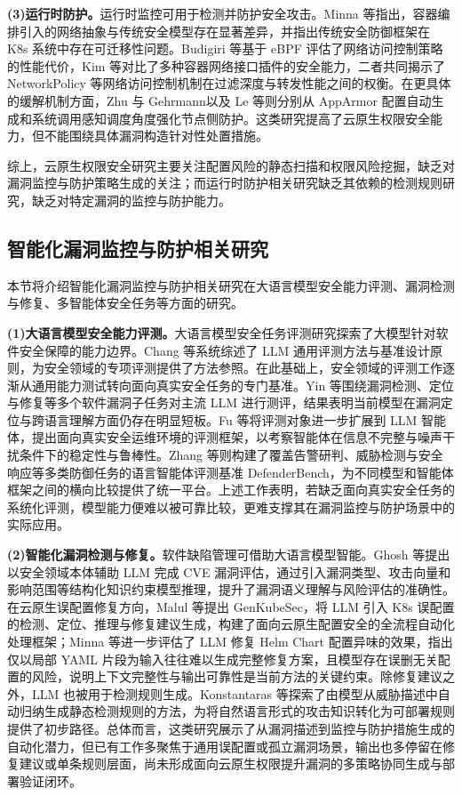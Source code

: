 \textbf{(3)运行时防护。}运行时监控可用于检测并防护安全攻击。Minna 等\cite{Minna_2021}指出，容器编排引入的网络抽象与传统安全模型存在显著差异，并指出传统安全防御框架在 K8s 系统中存在可迁移性问题。Budigiri 等\cite{Budigiri_2021}基于 eBPF 评估了网络访问控制策略的性能代价，Kim 等\cite{Kim_2025}对比了多种容器网络接口插件的安全能力，二者共同揭示了 NetworkPolicy 等网络访问控制机制在过滤深度与转发性能之间的权衡。在更具体的缓解机制方面，Zhu 与 Gehrmann\cite{Zhu_2022}以及 Le 等\cite{Le_2023}则分别从 AppArmor 配置自动生成和系统调用感知调度角度强化节点侧防护。这类研究提高了云原生权限安全能力，但不能围绕具体漏洞构造针对性处置措施。


综上，云原生权限安全研究主要关注配置风险的静态扫描和权限风险挖掘，缺乏对漏洞监控与防护策略生成的关注；而运行时防护相关研究缺乏其依赖的检测规则研究，缺乏对特定漏洞的监控与防护能力。

\subsection{智能化漏洞监控与防护相关研究}

本节将介绍智能化漏洞监控与防护相关研究在大语言模型安全能力评测、漏洞检测与修复、多智能体安全任务等方面的研究。

\textbf{(1)大语言模型安全能力评测。}大语言模型安全任务评测研究探索了大模型针对软件安全保障的能力边界。Chang 等\cite{chang2024survey}系统综述了 LLM 通用评测方法与基准设计原则，为安全领域的专项评测提供了方法参照。在此基础上，安全领域的评测工作逐渐从通用能力测试转向面向真实安全任务的专门基准。Yin 等\cite{yin2024multitask}围绕漏洞检测、定位与修复等多个软件漏洞子任务对主流 LLM 进行测评，结果表明当前模型在漏洞定位与跨语言理解方面仍存在明显短板。Fu 等\cite{fu2025raseval}将评测对象进一步扩展到 LLM 智能体，提出面向真实安全运维环境的评测框架，以考察智能体在信息不完整与噪声干扰条件下的稳定性与鲁棒性。Zhang 等\cite{zhang2025defenderbench}则构建了覆盖告警研判、威胁检测与安全响应等多类防御任务的语言智能体评测基准 DefenderBench，为不同模型和智能体框架之间的横向比较提供了统一平台。上述工作表明，若缺乏面向真实安全任务的系统化评测，模型能力便难以被可靠比较，更难支撑其在漏洞监控与防护场景中的实际应用。

\textbf{(2)智能化漏洞检测与修复。}软件缺陷管理可借助大语言模型智能。Ghosh 等\cite{ghosh2025cve}提出以安全领域本体辅助 LLM 完成 CVE 漏洞评估，通过引入漏洞类型、攻击向量和影响范围等结构化知识约束模型推理，提升了漏洞语义理解与风险评估的准确性。在云原生误配置修复方向，Malul 等\cite{malul2024genkubesec}提出 GenKubeSec，将 LLM 引入 K8s 误配置的检测、定位、推理与修复建议生成，构建了面向云原生配置安全的全流程自动化处理框架；Minna 等\cite{minna2025analyzing}进一步评估了 LLM 修复 Helm Chart 配置异味的效果，指出仅以局部 YAML 片段为输入往往难以生成完整修复方案，且模型存在误删无关配置的风险，说明上下文完整性与输出可靠性是当前方法的关键约束。除修复建议之外，LLM 也被用于检测规则生成。Konstantaras 等\cite{konstantaras2026edrrules}探索了由模型从威胁描述中自动归纳生成静态检测规则的方法，为将自然语言形式的攻击知识转化为可部署规则提供了初步路径。总体而言，这类研究展示了从漏洞描述到监控与防护措施生成的自动化潜力，但已有工作多聚焦于通用误配置或孤立漏洞场景，输出也多停留在修复建议或单条规则层面，尚未形成面向云原生权限提升漏洞的多策略协同生成与部署验证闭环。

